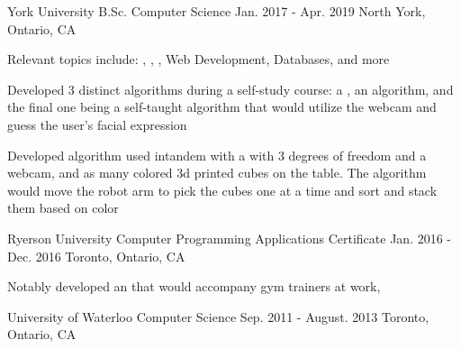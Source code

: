 

\begin{cventries}

  \cventry
    {York University} %
    {B.Sc. Computer Science} %
    {Jan. 2017 - Apr. 2019} %
    {North York, Ontario, CA} %
    {
      \begin{cvitems} %
        \item {Relevant topics include: , , , Web Development, Databases, and more}
        \item {Developed 3 distinct  algorithms during a self-study course: a , an  algorithm, and the final one being a self-taught  algorithm that would utilize the webcam and guess the user's facial expression}
        \item {Developed algorithm used intandem with a  with 3 degrees of freedom and a webcam, and as many colored 3d printed cubes on the table. The algorithm would move the robot arm to pick the cubes one at a time and sort and stack them based on color}
      \end{cvitems}
    }


  \cventry
  {Ryerson University} %
  {Computer Programming Applications Certificate} %
  {Jan. 2016 - Dec. 2016} %
  {Toronto, Ontario, CA} %
  {
    \begin{cvitems} %
      \item {Notably developed an  that would accompany gym trainers at work, }
    \end{cvitems}
  }

\cventry
{University of Waterloo} %
{Computer Science} %
{Sep. 2011 - August. 2013} %
{Toronto, Ontario, CA} %
{
}


\end{cventries}